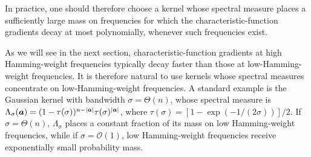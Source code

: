 \documentclass{article}
\theoremstyle{plain}
\theoremstyle{definition}
\newtheorem{definition}[theorem]{Definition}
\theoremstyle{remark}
\newtheorem{remark}[theorem]{Remark}
\begin{document}
In practice, one should therefore choose a kernel whose spectral measure places a sufficiently large mass on frequencies for which the characteristic-function gradients decay at most polynomially, whenever such frequencies exist. 


As we will see in the next section, characteristic-function gradients at high Hamming-weight frequencies typically decay faster than those at low-Hamming-weight frequencies. It is therefore natural to use kernels whose spectral measures concentrate on low-Hamming-weight frequencies. A standard example is the Gaussian kernel with bandwidth $\sigma=\Theta(n)$, whose spectral measure is $\Lambda_\sigma({\bm{a}}) = (1-\tau(\sigma))^{n-\abs{{\bm{a}}}} \tau(\sigma)^\abs{{\bm{a}}}$, where $\tau(\sigma) = [1-\exp(-1/(2 \sigma))]/2$. If $\sigma=\Theta(n)$, $\Lambda_\sigma$ places a constant fraction of its mass on low Hamming-weight frequencies, while if $\sigma=\mathcal{O}(1)$, low Hamming-weight frequencies receive exponentially small probability mass.
\end{document}
